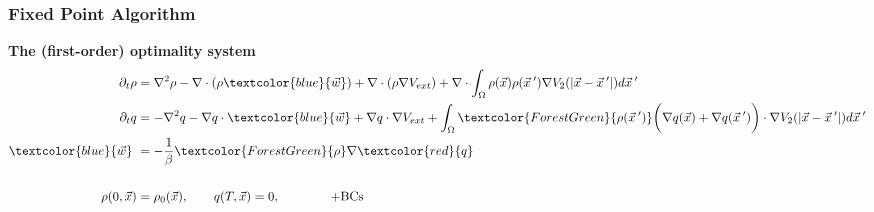 \documentclass[aspectratio=169,xcolor=dvipsnames]{beamer}
\begin{document}
\begin{frame}
	\frametitle{Fixed Point Algorithm}
	\textbf{The (first-order) optimality system}\\
	
	\begin{align*}
		\partial_t \rho &= \nabla^2 \rho - \nabla \cdot (\rho \textcolor{blue}{\vec{w}}) + \nabla \cdot \left(\rho \nabla V_{ext}\right)
		+ \nabla \cdot \int_\Omega \rho(\vec{x}) \rho(\vec{x}\hspace{0.2em}') \nabla V_2(|\vec{x}-\vec{x}\hspace{0.2em}'|)d\vec{x}\hspace{0.2em}'  \\
		\partial_t q &= -\nabla^2 q - \nabla q \cdot \textcolor{blue}{\vec{w}} + \nabla q \cdot \nabla V_{ext} + \int_\Omega \textcolor{ForestGreen}{\rho(\vec{x}\hspace{0.2em}')} \bigg(\nabla q(\vec{x}) + \nabla q(\vec{x}\hspace{0.2em}')\bigg)\cdot  \nabla V_2(|\vec{x}-\vec{x}\hspace{0.2em}'|)d\vec{x}\hspace{0.2em}' \\
		\textcolor{blue}{\vec{w}} \ &= - \frac{1}{\beta}\textcolor{ForestGreen}{\rho} \nabla  \textcolor{red}{q}\\
		\\
		\rho(0,\vec{x})&=\rho_0(\vec{x}), \qquad q(T,\vec{x})= 0, \qquad \qquad \text{+BCs}\\
	\end{align*}
\end{frame}
\end{document}
